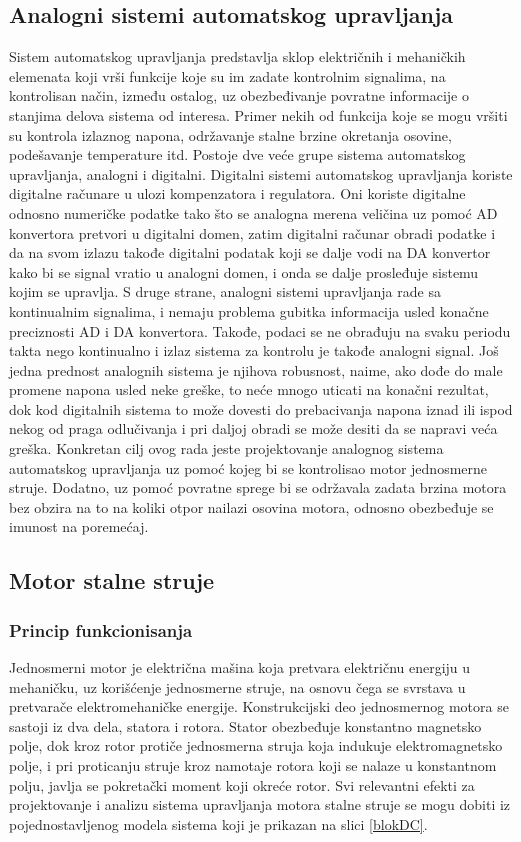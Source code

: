 \documentclass[a4paper, 12pt, diplomski]{etf}
\begin{document}
\subsection{Analogni sistemi automatskog upravljanja}
Sistem automatskog upravljanja predstavlja sklop električnih i mehaničkih elemenata koji vrši funkcije koje su im zadate kontrolnim signalima, na kontrolisan način, između ostalog, uz obezbeđivanje povratne informacije o stanjima delova sistema od interesa. Primer nekih od funkcija koje se mogu vršiti su kontrola izlaznog napona, održavanje stalne brzine okretanja osovine, podešavanje temperature itd. Postoje dve veće grupe sistema automatskog upravljanja, analogni i digitalni. 
Digitalni sistemi automatskog upravljanja koriste digitalne računare u ulozi kompenzatora i regulatora. Oni koriste digitalne odnosno numeričke podatke tako što se analogna merena veličina uz pomoć AD konvertora pretvori u digitalni domen, zatim digitalni računar obradi podatke i da na svom izlazu takođe digitalni podatak koji se dalje vodi na DA konvertor kako bi se signal vratio u analogni domen, i onda se dalje prosleđuje sistemu kojim se upravlja. S druge strane, analogni sistemi upravljanja rade sa kontinualnim signalima, i nemaju problema gubitka informacija usled konačne preciznosti AD i DA konvertora. Takođe, podaci se ne obrađuju na svaku periodu takta nego kontinualno i izlaz sistema za kontrolu je takođe analogni signal. Još jedna prednost analognih sistema je njihova robusnost, naime, ako dođe do male promene napona usled neke greške, to neće mnogo uticati na konačni rezultat, dok kod digitalnih sistema to može dovesti do prebacivanja napona iznad ili ispod nekog od praga odlučivanja i pri daljoj obradi se može desiti da se napravi veća greška. Konkretan cilj ovog rada jeste projektovanje analognog sistema automatskog upravljanja uz pomoć kojeg bi se kontrolisao motor jednosmerne struje. Dodatno, uz pomoć povratne sprege bi se održavala zadata brzina motora bez obzira na to na koliki otpor nailazi osovina motora, odnosno obezbeđuje se imunost na poremećaj.

\subsection{Motor stalne struje}
\subsubsection{Princip funkcionisanja}

Jednosmerni motor je električna mašina koja pretvara električnu energiju u mehaničku, uz korišćenje jednosmerne struje, na osnovu čega se svrstava u pretvarače elektromehaničke energije. Konstrukcijski deo jednosmernog motora se sastoji iz dva dela, statora i rotora. Stator obezbeđuje konstantno magnetsko polje, dok kroz rotor protiče jednosmerna struja koja indukuje elektromagnetsko polje, i pri proticanju struje kroz namotaje rotora koji se nalaze u konstantnom polju, javlja se pokretački moment koji okreće rotor. Svi relevantni efekti za projektovanje i analizu sistema upravljanja motora stalne struje se mogu dobiti iz pojednostavljenog modela sistema koji je prikazan na slici \ref{blokDC}.
\end{document}
